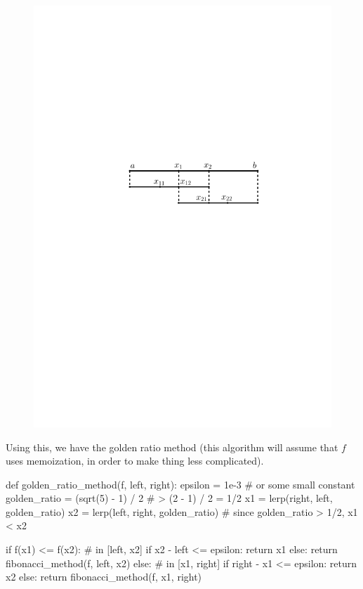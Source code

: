 \begin{figure}
  \centering
  \includegraphics[scale=0.5]{figures/b}
\end{figure}

Using this, we have the golden ratio method (this algorithm will assume that \(
f\) uses memoization, in order to make thing less complicated).
\begin{python}
def golden_ratio_method(f, left, right):
  epsilon = 1e-3 # or some small constant
  golden_ratio = (sqrt(5) - 1) / 2 # > (2 - 1) / 2 = 1/2
  x1 = lerp(right, left, golden_ratio)
  x2 = lerp(left, right, golden_ratio) # since golden_ratio > 1/2, x1 < x2

  if f(x1) <= f(x2):
    # in [left, x2]
    if x2 - left <= epsilon:
      return x1
    else:
      return fibonacci_method(f, left, x2)
  else:
    # in [x1, right]
    if right - x1 <= epsilon:
      return x2
    else:
      return fibonacci_method(f, x1, right)
\end{python}

